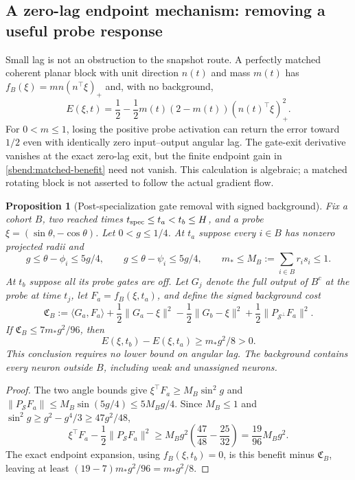 \documentclass{article} %
\theoremstyle{plain}
\newtheorem{proposition}[theorem]{Proposition}
\theoremstyle{definition}
\theoremstyle{remark}
\begin{document}
\subsection{A zero-lag endpoint mechanism: removing a useful probe response}

Small lag is not an obstruction to the snapshot route. A perfectly
matched coherent planar block with unit direction $n(t)$ and mass $m(t)$
has $f_B(\xi)=m n(n^\top\xi)_+$ and, with no background,
\begin{equation}\label{sbend:matched-benefit}
 E(\xi,t)=\frac12-\frac12m(t)(2-m(t))(n(t)^\top\xi)_+^2.
\end{equation}
For $0<m\le1$, losing the positive probe activation can return the
error toward $1/2$ even with identically zero input--output angular lag.
The gate-exit derivative vanishes at the exact zero-lag exit, but the
finite endpoint gain in \eqref{sbend:matched-benefit} need not vanish.
This calculation is algebraic; a matched rotating block is not asserted
to follow the actual gradient flow.

\begin{proposition}[Post-specialization gate removal with signed background]
\label{sbend:sweep-certificate}
Fix a cohort $B$, two reached times $t_{\rm spec}\le t_a<t_b\le H$,
and a probe $\xi=(\sin\theta,-\cos\theta)$. Let $0<g\le1/4$.
At $t_a$ suppose every $i\in B$ has nonzero projected radii and
\[
 g\le\theta-\phi_i\le5g/4,\qquad
 g\le\theta-\psi_i\le5g/4,\qquad
 m_*\le M_B:=\sum_{i\in B}r_is_i\le1.
\]
At $t_b$ suppose all its probe gates are off. Let $G_j$ denote the full
output of $B^c$ at the probe at time $t_j$, let
$F_a=f_B(\xi,t_a)$, and define the signed background cost
\begin{equation}\label{sbend:background-cost}
 \mathfrak C_B:=\langle G_a,F_a\rangle
 +\frac12\|G_a-\xi\|^2-\frac12\|G_b-\xi\|^2
 +\frac12\|P_{\mathcal S^\perp}F_a\|^2.
\end{equation}
If $\mathfrak C_B\le7m_*g^2/96$, then
\begin{equation}\label{sbend:sweep-gap}
 E(\xi,t_b)-E(\xi,t_a)\ge m_*g^2/8>0.
\end{equation}
This conclusion requires no lower bound on angular lag. The background
contains every neuron outside $B$, including weak and unassigned neurons.
\end{proposition}
\begin{proof}
The two angle bounds give
$\xi^\top F_a\ge M_B\sin^2g$ and
$\|P_{\mathcal S}F_a\|\le M_B\sin(5g/4)\le5M_Bg/4$.
Since $M_B\le1$ and
$\sin^2g\ge g^2-g^4/3\ge47g^2/48$,
\[
 \xi^\top F_a-\frac12\|P_{\mathcal S}F_a\|^2
 \ge M_Bg^2\left(\frac{47}{48}-\frac{25}{32}\right)
 =\frac{19}{96}M_Bg^2.
\]
The exact endpoint expansion, using $f_B(\xi,t_b)=0$, is this
benefit minus $\mathfrak C_B$, leaving at least
$(19-7)m_*g^2/96=m_*g^2/8$.
\end{proof}
\end{document}
